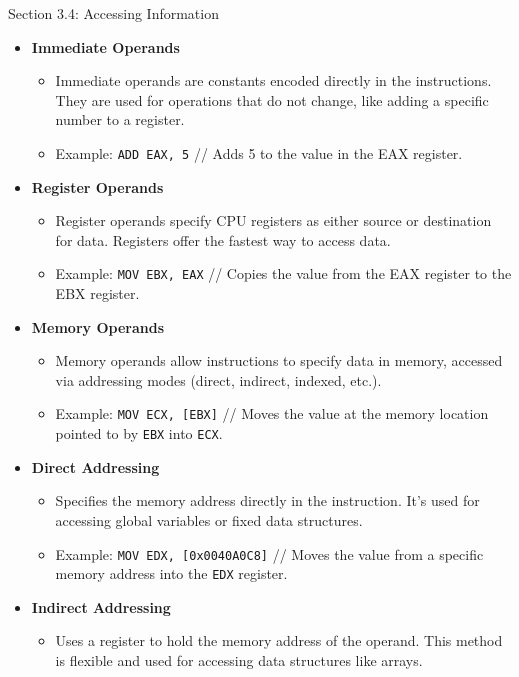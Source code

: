 \begin{notes}{Section 3.4: Accessing Information}
    \begin{itemize}
        \item \textbf{Immediate Operands}
        \begin{itemize}
            \item Immediate operands are constants encoded directly in the instructions. They are used for operations that do not change, like adding a specific number to a register.
            \item Example: \texttt{ADD EAX, 5} // Adds 5 to the value in the EAX register.
        \end{itemize}
        \item \textbf{Register Operands}
        \begin{itemize}
            \item Register operands specify CPU registers as either source or destination for data. Registers offer the fastest way to access data.
            \item Example: \texttt{MOV EBX, EAX} // Copies the value from the EAX register to the EBX register.
        \end{itemize}
        \item \textbf{Memory Operands}
        \begin{itemize}
            \item Memory operands allow instructions to specify data in memory, accessed via addressing modes (direct, indirect, indexed, etc.).
            \item Example: \texttt{MOV ECX, [EBX]} // Moves the value at the memory location pointed to by \texttt{EBX} into \texttt{ECX}.
        \end{itemize}
        \item \textbf{Direct Addressing}
        \begin{itemize}
            \item Specifies the memory address directly in the instruction. It's used for accessing global variables or fixed data structures.
            \item Example: \texttt{MOV EDX, [0x0040A0C8]} // Moves the value from a specific memory address into the \texttt{EDX} register.
        \end{itemize}
        \item \textbf{Indirect Addressing}
        \begin{itemize}
            \item Uses a register to hold the memory address of the operand. This method is flexible and used for accessing data structures like arrays.

\end{itemize}
\end{itemize}
\end{notes}

